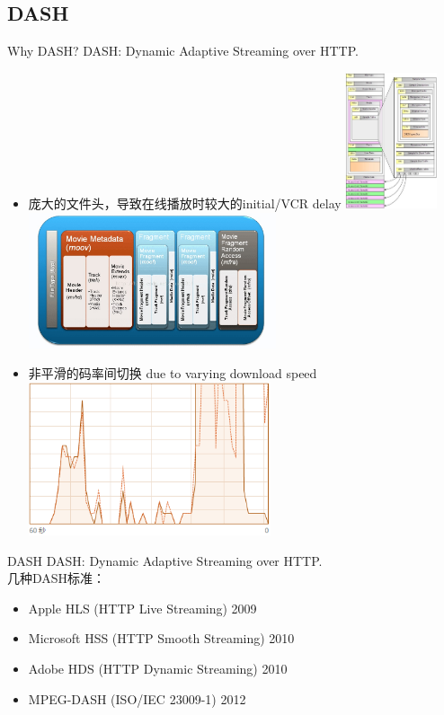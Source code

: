 \documentclass{beamer}
\begin{document}
\subsection{DASH}
\begin{frame}{Why DASH?}
DASH: Dynamic Adaptive Streaming over HTTP.
\pause
\begin{itemize}
\item 庞大的文件头，导致在线播放时较大的initial/VCR delay
\includegraphics[height=4cm]{fig/MP4_boxes_detail.jpg}
\includegraphics[height=4cm]{fig/fragmented_mp4.jpg}
\end{itemize}
\end{frame}
\begin{frame}
\begin{itemize}
\item 非平滑的码率间切换 due to varying download speed
\includegraphics[height=4.5cm]{fig/download_speed.png}
\end{itemize}
\end{frame}
\begin{frame}{DASH}
DASH: Dynamic Adaptive Streaming over HTTP. \\
几种DASH标准：
\pause
\begin{itemize}
\item Apple HLS (HTTP Live Streaming) 2009
\item Microsoft HSS (HTTP Smooth Streaming) 2010
\item Adobe HDS (HTTP Dynamic Streaming) 2010
\item MPEG-DASH (ISO/IEC 23009-1) 2012
\end{itemize}
\end{frame}
\end{document}
